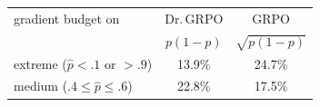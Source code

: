 \setlength{\tabcolsep}{5pt}
\begin{tabular}{lcc}
\toprule
gradient budget on & Dr.\,GRPO & GRPO \\
 & $p(1{-}p)$ & $\sqrt{p(1{-}p)}$ \\
\midrule
extreme ($\hat p{<}.1$ or ${>}.9$) & 13.9\% & 24.7\% \\
medium ($.4{\le}\hat p{\le}.6$) & 22.8\% & 17.5\% \\
\bottomrule
\end{tabular}
